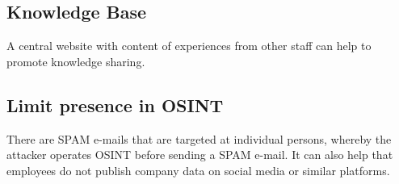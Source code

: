 \subsection{Knowledge Base}
A central website with content of experiences from other staff can help to promote knowledge sharing.

\subsection{Limit presence in OSINT}
There are SPAM e-mails that are targeted at individual persons, whereby the attacker operates OSINT before sending a SPAM e-mail.
It can also help that employees do not publish company data on social media or similar platforms.